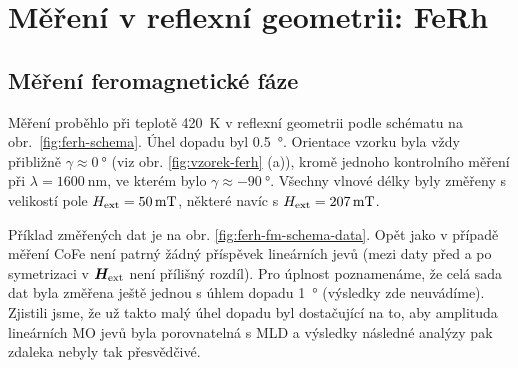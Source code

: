 \section{Měření v reflexní geometrii: FeRh}
\label{chap:vysledky-ferh}

\subsection{Měření feromagnetické fáze}
\label{chap:ferh-fm}

Měření proběhlo při teplotě \SI{420}{\kelvin} v reflexní geometrii podle schématu na obr.~\ref{fig:ferh-schema}.
Úhel dopadu byl \SI{0.5}{\degree}.
Orientace vzorku byla vždy přibližně $\gamma\approx\SI{0}{\degree}$ (viz obr. \ref{fig:vzorek-ferh} (a)), kromě jednoho kontrolního měření při $\lambda=\SI{1600}{\nano\meter}$, ve kterém bylo $\gamma\approx\SI{-90}{\degree}$.
Všechny vlnové délky byly změřeny s velikostí pole $H_\textrm{ext}=\SI{50}{\milli\tesla}$, některé navíc s $H_\textrm{ext}=\SI{207}{\milli\tesla}$.

Příklad změřených dat je na obr. \ref{fig:ferh-fm-schema-data}.
Opět jako v případě měření CoFe není patrný žádný příspěvek lineárních jevů (mezi daty před a po symetrizaci v $\bm{H}_\textrm{ext}$ není přílišný rozdíl).
Pro úplnost poznamenáme, že celá sada dat byla změřena ještě jednou s úhlem dopadu \SI{1}{\degree} (výsledky zde neuvádíme).
Zjistili jsme, že už takto malý úhel dopadu byl dostačující na to, aby amplituda lineárních MO jevů byla porovnatelná s MLD a výsledky následné analýzy pak zdaleka nebyly tak přesvědčivé.

